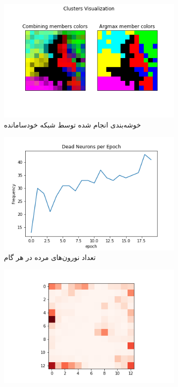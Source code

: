 \documentclass[12pt, a4paper]{article}
\begin{document}
\clearpage

\begin{figure}[h]
    \begin{subfigure}{\linewidth}
        \centering
        \includegraphics[width=0.8\linewidth]{images/q5/r17/cluster.png}
        \caption{خوشه‌بندی انجام شده توسط شبکه خودسامانده}
    \end{subfigure}
    \newline
    \begin{subfigure}{0.45\linewidth}
        \includegraphics[width=\linewidth]{images/q5/r17/dead.png}
        \caption{تعداد نورون‌های مرده در هر گام}
    \end{subfigure}
    \hfill
    \begin{subfigure}{0.45\linewidth}
        \includegraphics[width=\linewidth]{images/q5/r17/umatrix.png}

\end{subfigure}
\end{figure}
\end{document}
